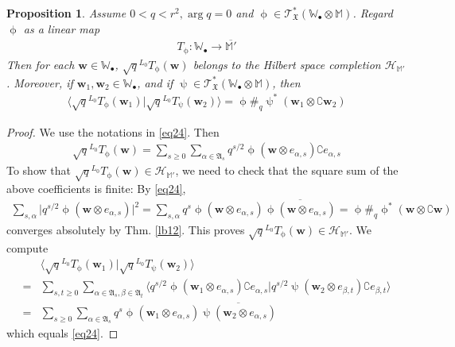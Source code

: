 \documentclass[11pt,b5paper,notitlepage]{article}
\theoremstyle{definition}
\theoremstyle{plain}
\newtheorem{pp}[df]{Proposition}
\newcommand{\fk}{\mathfrak}
\newcommand{\mc}{\mathcal}
\newcommand{\ovl}{\overline}
\newcommand{\bigbk}[1]{\big\langle {#1}\big\rangle}
\newcommand{\scr}{\mathscr}
\newcommand{\Co}{\complement}
\newcommand{\blt}{\bullet}
\newcommand{\Wbb}{\mathbb W}
\newcommand{\Mbb}{\mathbb M}
\newcommand{\wbf}{\mathbf w}
\numberwithin{equation}{section}
\begin{document}
\begin{pp}\label{lb17}
Assume $0<q<r^2,\arg q=0$ and $\upphi\in\scr T_{\fk X}^*(\Wbb_\blt\otimes\Mbb)$. Regard $\upphi$ as a linear map 
\begin{align*}
T_\upphi:\Wbb_\blt\rightarrow \ovl{\Mbb'}
\end{align*}
Then for each $\wbf\in\Wbb_\blt$, $\sqrt q^{L_0}T_\upphi(\wbf)$ belongs to the Hilbert space completion $\mc H_{\Mbb'}$. Moreover, if $\wbf_1,\wbf_2\in\Wbb_\blt$, and if $\uppsi\in\scr T_{\fk X}^*(\Wbb_\blt\otimes\Mbb)$, then
\begin{gather}
\bigbk{\sqrt q^{L_0}T_\upphi(\wbf_1)\big|\sqrt q^{L_0}T_\uppsi(\wbf_2) }=\upphi\#_q\uppsi^*(\wbf_1\otimes\Co\wbf_2)
\end{gather}
\end{pp}



\begin{proof}
We use the notations in \eqref{eq24}. Then
\begin{align*}
\sqrt q^{L_0}T_\upphi(\wbf)=\sum_{s\geq 0}\sum_{\alpha\in\fk A_s}q^{s/2}\upphi(\wbf\otimes e_{\alpha,s})\Co e_{\alpha,s}
\end{align*}
To show that $\sqrt q^{L_0}T_\upphi(\wbf)\in\mc H_{\Mbb'}$, we need to check that the square sum of the above coefficients is finite: By \eqref{eq24},
\begin{align*}
\sum_{s,\alpha}\big|q^{s/2}\upphi(\wbf\otimes e_{\alpha,s})\big|^2=\sum_{s,\alpha} q^s\upphi(\wbf\otimes e_{\alpha,s})\ovl{\upphi(\wbf\otimes e_{\alpha,s})}=\upphi\#_q\upphi^*(\wbf\otimes \Co\wbf)
\end{align*}
converges absolutely by Thm. \ref{lb12}. This proves $\sqrt q^{L_0}T_\upphi(\wbf)\in\mc H_{\Mbb'}$. We compute
\begin{align*}
&\bigbk{\sqrt q^{L_0}T_\upphi(\wbf_1)\big|\sqrt q^{L_0}T_\uppsi(\wbf_2) }  \nonumber\\
=&\sum_{s,t\geq0}\sum_{\alpha\in\fk A_s,\beta\in\fk A_t}\bigbk{q^{s/2}\upphi(\wbf_1\otimes e_{\alpha,s})\Co e_{\alpha,s} \big|q^{s/2}\uppsi(\wbf_2\otimes e_{\beta,t})\Co e_{\beta,t} }\nonumber\\
=&\sum_{s\geq 0}\sum_{\alpha\in\fk A_s} q^s\upphi(\wbf_1\otimes e_{\alpha,s})\ovl{\uppsi(\wbf_2\otimes e_{\alpha,s})}
\end{align*}
which equals \eqref{eq24}.
\end{proof}
\end{document}
